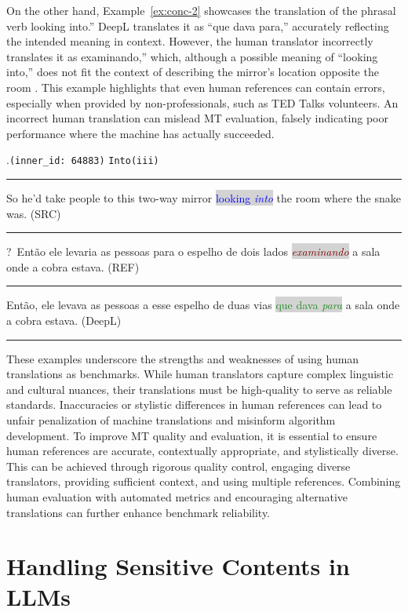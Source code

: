On the other hand, Example~\ref{ex:conc-2} showcases the translation of the phrasal verb looking into.'' DeepL translates it as ``que dava para,'' accurately reflecting the intended meaning in context. However, the human translator incorrectly translates it as examinando,'' which, although a possible meaning of ``looking into,'' does not fit the context of describing the mirror's location opposite the room \parencite{collinsdictionary}. This example highlights that even human references can contain errors, especially when provided by non-professionals, such as TED Talks volunteers. An incorrect human translation can mislead MT evaluation, falsely indicating poor performance where the machine has actually succeeded.

\ex.\texttt{(inner\_id: 64883)} \hfill \texttt{Into(iii)} \\[0.3ex]
\noindent\rule{\linewidth}{0.9pt}
So he'd take people to this two-way mirror \colorbox{lightgray}{\textcolor{blue}{looking \emph{into}}} the room where the snake was. (SRC) \\[-0.3ex] \label{ex:conc-2}
\noindent\rule{\linewidth}{0.3pt}
?~Então ele levaria as pessoas para o espelho de dois lados \colorbox{lightgray}{\textcolor{Maroon}{\emph{examinando}}} a sala onde a cobra estava. (REF) \\[-0.3ex]
\noindent\rule{\linewidth}{0.3pt}
Então, ele levava as pessoas a esse espelho de duas vias \colorbox{lightgray}{\textcolor{ForestGreen}{que dava \emph{para}}} a sala onde a cobra estava. (DeepL) \\[-0.3ex]
\noindent\rule{\linewidth}{0.9pt}

These examples underscore the strengths and weaknesses of using human translations as benchmarks. While human translators capture complex linguistic and cultural nuances, their translations must be high-quality to serve as reliable standards. Inaccuracies or stylistic differences in human references can lead to unfair penalization of machine translations and misinform algorithm development. To improve MT quality and evaluation, it is essential to ensure human references are accurate, contextually appropriate, and stylistically diverse. This can be achieved through rigorous quality control, engaging diverse translators, providing sufficient context, and using multiple references. Combining human evaluation with automated metrics and encouraging alternative translations can further enhance benchmark reliability.


\section{Handling Sensitive Contents in LLMs} 


